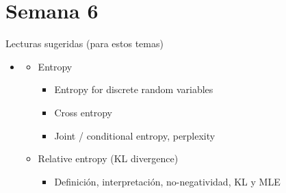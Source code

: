 \part{Semana 6}

\begin{frame}
  \titlepage
\end{frame}

\begin{frame}{Lecturas sugeridas (para estos temas)}
\begin{itemize}
  \item {}
  \begin{itemize}
    \item {} Entropy
    \begin{itemize}
      \item {} Entropy for discrete random variables
      \item {} Cross entropy
      \item {} Joint / conditional entropy, perplexity
    \end{itemize}
    \item {} Relative entropy (KL divergence)
    \begin{itemize}
      \item {} Definición, interpretación, no-negatividad, KL y MLE
    \end{itemize}
  \end{itemize}
\end{itemize}
\end{frame}

